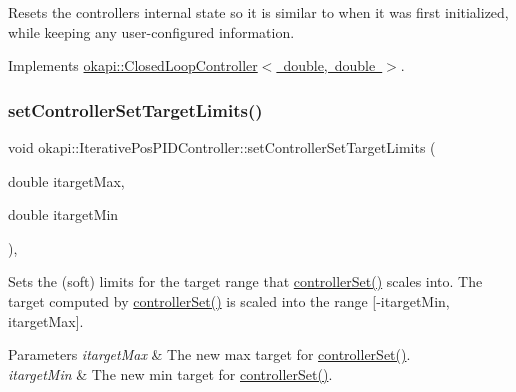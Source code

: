 Resets the controller\textquotesingle{}s internal state so it is similar to when it was first initialized, while keeping any user-\/configured information. 

Implements \mbox{\hyperlink{classokapi_1_1ClosedLoopController_a7dd6ce28b3e38bdf987514a1b6c83c8c}{okapi\+::\+Closed\+Loop\+Controller$<$ double, double $>$}}.

\mbox{\label{classokapi_1_1IterativePosPIDController_a556937096c9a1331e705a8fa9175c884}} 
\subsubsection{\texorpdfstring{setControllerSetTargetLimits()}{setControllerSetTargetLimits()}}
{\footnotesize\ttfamily void okapi\+::\+Iterative\+Pos\+P\+I\+D\+Controller\+::set\+Controller\+Set\+Target\+Limits (\begin{DoxyParamCaption}\item[{double}]{itarget\+Max,  }\item[{double}]{itarget\+Min }\end{DoxyParamCaption})\hspace{0.3cm}{\ttfamily [override]}, {\ttfamily [virtual]}}

Sets the (soft) limits for the target range that \mbox{\hyperlink{classokapi_1_1IterativePosPIDController_ab77771ba39d01e5f8d29984fd43abd38}{controller\+Set()}} scales into. The target computed by \mbox{\hyperlink{classokapi_1_1IterativePosPIDController_ab77771ba39d01e5f8d29984fd43abd38}{controller\+Set()}} is scaled into the range \mbox{[}-\/itarget\+Min, itarget\+Max\mbox{]}.


\begin{DoxyParams}{Parameters}
{\em itarget\+Max} & The new max target for \mbox{\hyperlink{classokapi_1_1IterativePosPIDController_ab77771ba39d01e5f8d29984fd43abd38}{controller\+Set()}}. \\
\hline
{\em itarget\+Min} & The new min target for \mbox{\hyperlink{classokapi_1_1IterativePosPIDController_ab77771ba39d01e5f8d29984fd43abd38}{controller\+Set()}}. \\
\hline
\end{DoxyParams}


